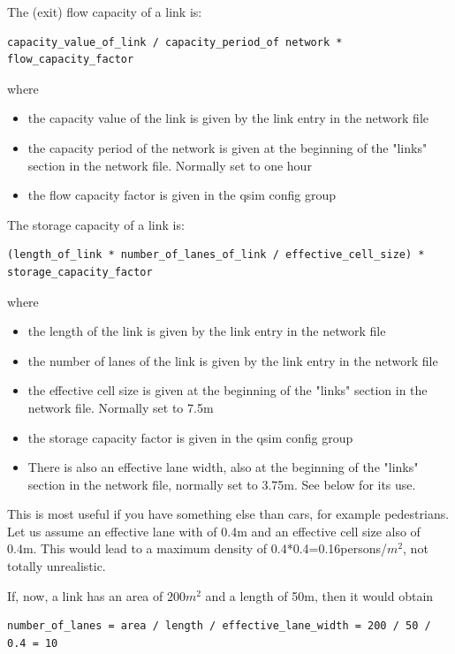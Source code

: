 The (exit) flow capacity of a link is:
\begin{verbatim}
capacity_value_of_link / capacity_period_of network * flow_capacity_factor

\end{verbatim}

where
\begin{itemize}
	\item the capacity value of the link is given by the link entry in the network file
	\item the  capacity period of the network is given at the beginning of the "links"  section in the network file. Normally set to one hour
	\item the flow capacity factor is given in the qsim config group
\end{itemize}

The storage capacity of a link is:
\begin{verbatim}
(length_of_link * number_of_lanes_of_link / effective_cell_size) * storage_capacity_factor

\end{verbatim}

where
\begin{itemize}
	\item the length of the link is given by the link entry in the network file
	\item the number of lanes of the link is given by the link entry in the network file
	\item the effective cell size is given at the beginning of the "links" section in the network file. Normally set to 7.5m
	\item the storage capacity factor is given in the qsim config group
	\item There  is also an effective lane width, also at the beginning of the "links"  section in the network file, normally set to 3.75m. See below for  its use.
\end{itemize}

This is most useful if you have something else than  cars, for example pedestrians. Let us assume an effective lane  with of 0.4m and an effective cell size also of 0.4m. This would  lead to a maximum density of 0.4*0.4=0.16persons/$m^2$, not totally  unrealistic.

If, now, a link has an area of $200m^2$ and a length of 50m, then it would obtain
\begin{verbatim}
number_of_lanes = area / length / effective_lane_width = 200 / 50 / 0.4 = 10

\end{verbatim}

